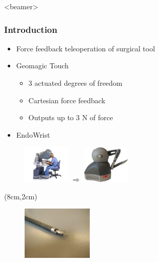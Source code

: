 \begin{frame}<beamer>
\frametitle{Introduction}
\begin{itemize}
\item Force feedback teleoperation of surgical tool
\item Geomagic Touch 
\begin{itemize}
\item 3 actuated degrees of freedom 
\item Cartesian force feedback
\item Outputs up to 3 N of force
\end{itemize}
\item EndoWrist
\end{itemize}

\begin{figure}
	\includegraphics[width=0.2\textwidth]{Billeder/Dan/console.jpg}
	\hspace{8mm}\vspace{-8mm} $\Rightarrow $ \vspace{8mm}\hspace{8mm}
	\includegraphics[width=0.2\textwidth]{Billeder/GT.png}
\end{figure}

\begin{textblock*}{0.7\textwidth}(8cm,2cm) %
	\begin{figure}[H]
		\centering
		\centering
		\includegraphics[width=0.3\textwidth]{Billeder/Endowrist3}
	\end{figure}
\end{textblock*}


\end{frame}

